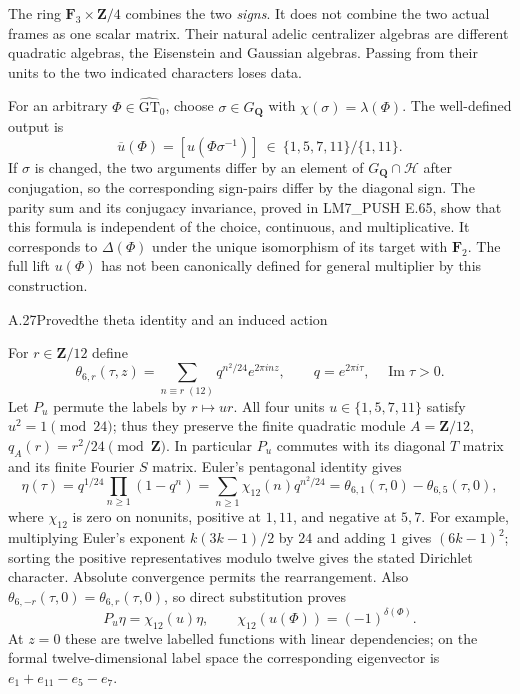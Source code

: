 The ring $\mathbf F_3\times\mathbf Z/4$ combines the two \emph{signs}.
It does not combine the two actual frames as one scalar matrix.  Their
natural adelic centralizer algebras are different quadratic algebras,
the Eisenstein and Gaussian algebras.  Passing from their units to the
two indicated characters loses data.

For an arbitrary $\Phi\in\widehat{\mathrm{GT}}_0$, choose
$\sigma\in G_{\mathbf Q}$ with $\chi(\sigma)=\lambda(\Phi)$.
The well-defined output is
\[
 \overline u(\Phi)=
 [u(\Phi\sigma^{-1})]\ \in\
 \{1,5,7,11\}/\{1,11\}.
\]
If $\sigma$ is changed, the two arguments differ by an element of
$G_{\mathbf Q}\cap\mathcal H$ after conjugation, so the corresponding
sign-pairs differ by the diagonal sign.  The parity sum and its
conjugacy invariance, proved in LM7\_PUSH E.65, show that this formula
is independent of the choice, continuous, and multiplicative.
It corresponds to $\Delta(\Phi)$ under the unique isomorphism of its
target with $\mathbf F_2$.  The full lift $u(\Phi)$ has not been
canonically defined for general multiplier by this construction.

\begin{statement}{A.27}{Proved}{the theta identity and an induced action}
\citep{LitAtiyah1987}
\end{statement}
For $r\in\mathbf Z/12$ define
\[
 \theta_{6,r}(\tau,z)=
 \sum_{n\equiv r\;(12)}q^{n^2/24}e^{2\pi inz},
 \qquad q=e^{2\pi i\tau},\quad\operatorname{Im}\tau>0.
\]
Let $P_u$ permute the labels by $r\mapsto ur$.
All four units $u\in\{1,5,7,11\}$ satisfy $u^2=1\pmod{24}$;
thus they preserve the finite quadratic module
$A=\mathbf Z/12$, $q_A(r)=r^2/24\pmod{\mathbf Z}$.
In particular $P_u$ commutes with its diagonal $T$ matrix and its
finite Fourier $S$ matrix.  Euler's pentagonal identity gives
\[
 \eta(\tau)=q^{1/24}\prod_{n\ge1}(1-q^n)
 =\sum_{n\ge1}\chi_{12}(n)q^{n^2/24}
 =\theta_{6,1}(\tau,0)-\theta_{6,5}(\tau,0),
\]
where $\chi_{12}$ is zero on nonunits, positive at $1,11$, and
negative at $5,7$.  For example, multiplying Euler's exponent
$k(3k-1)/2$ by $24$ and adding $1$ gives $(6k-1)^2$;
sorting the positive representatives modulo twelve gives the stated
Dirichlet character.  Absolute convergence permits the rearrangement.
Also $\theta_{6,-r}(\tau,0)=\theta_{6,r}(\tau,0)$, so direct
substitution proves
\[
 P_u\eta=\chi_{12}(u)\eta,
 \qquad
 \chi_{12}(u(\Phi))=(-1)^{\delta(\Phi)}.
\]
At $z=0$ these are twelve labelled functions with linear dependencies;
on the formal twelve-dimensional label space the corresponding
eigenvector is $e_1+e_{11}-e_5-e_7$.

